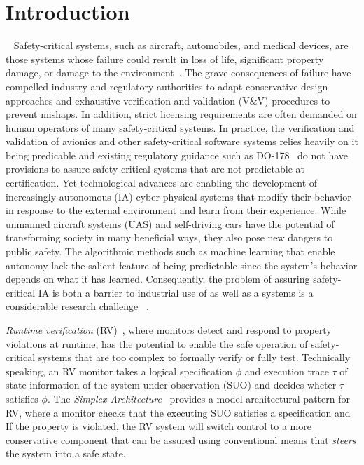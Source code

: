 \section{Introduction}~\label{sec:intro} 
Safety-critical systems, such as aircraft, automobiles, and medical
devices, are those systems whose failure could result
in loss of life, significant property damage, or damage to the
environment~\cite{Knight2002}.  The  grave consequences of failure have compelled
industry and regulatory authorities  to adapt conservative design
approaches and exhaustive verification and validation (V\&V) procedures
to prevent mishaps. In addition, strict licensing requirements are
often demanded on human operators of  many safety-critical systems.
In practice, the verification and validation of avionics
and other safety-critical software systems relies heavily on it being
predicable and existing regulatory guidance  such as
DO-178~\cite{DO178B}  do not  have provisions to
assure safety-critical systems that are not predictable at certification. 
Yet technological advances are enabling the development of increasingly
autonomous (IA) cyber-physical  systems that modify their behavior in response
to the external environment and learn from their experience.  While
unmanned aircraft systems (UAS) and self-driving cars have the
potential of transforming society in many beneficial ways, they also
pose new dangers to public safety. The algorithmic methods such as
machine learning that enable autonomy lack the salient feature of
being predictable since the system's behavior depends on what it has
learned.  Consequently, the  problem  of assuring safety-critical IA is
both a barrier to industrial use of  as well as a 
systems is a considerable research challenge~\cite{NRC14} .


\emph{Runtime verification} (RV)~\cite{monitors}, where monitors
detect and respond to property violations at runtime, has the
potential to enable the safe operation of safety-critical systems that
are too complex to formally verify or fully test.  Technically
speaking, an RV monitor takes a logical specification $\phi$ and
execution trace $\tau$ of state information of the system under
observation (SUO) and decides wheter $\tau$ satisfies $\phi$. The
\emph{Simplex Architecture}~\cite{simplex} provides a model
architectural pattern for RV, where a monitor checks that the
executing SUO satisfies a specification and If the property is
violated, the RV system will switch control to a more conservative
component that can be assured using conventional means that
\emph{steers} the system into a safe state.

